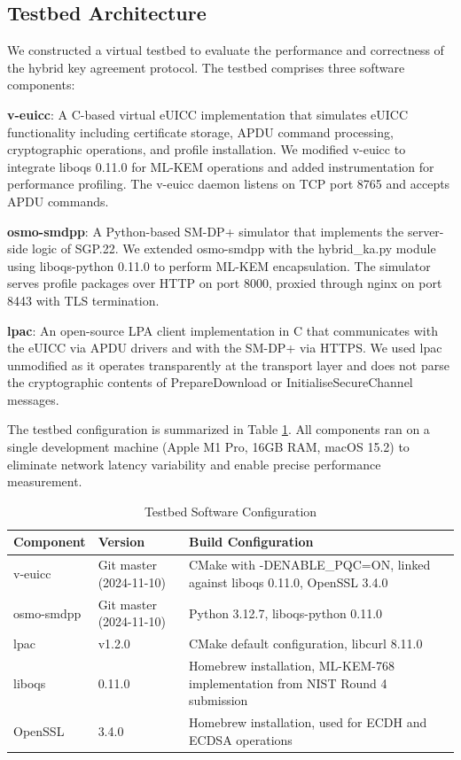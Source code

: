 \documentclass{easychair}
\begin{document}
\subsection{Testbed Architecture}

We constructed a virtual testbed to evaluate the performance and correctness of the hybrid key agreement protocol. The testbed comprises three software components:

\textbf{v-euicc}: A C-based virtual eUICC implementation that simulates eUICC functionality including certificate storage, APDU command processing, cryptographic operations, and profile installation. We modified v-euicc to integrate liboqs 0.11.0 for ML-KEM operations and added instrumentation for performance profiling. The v-euicc daemon listens on TCP port 8765 and accepts APDU commands.

\textbf{osmo-smdpp}: A Python-based SM-DP+ simulator that implements the server-side logic of SGP.22. We extended osmo-smdpp with the hybrid\_ka.py module using liboqs-python 0.11.0 to perform ML-KEM encapsulation. The simulator serves profile packages over HTTP on port 8000, proxied through nginx on port 8443 with TLS termination.

\textbf{lpac}: An open-source LPA client implementation in C that communicates with the eUICC via APDU drivers and with the SM-DP+ via HTTPS. We used lpac unmodified as it operates transparently at the transport layer and does not parse the cryptographic contents of PrepareDownload or InitialiseSecureChannel messages.

The testbed configuration is summarized in Table \ref{tab:testbed-config}. All components ran on a single development machine (Apple M1 Pro, 16GB RAM, macOS 15.2) to eliminate network latency variability and enable precise performance measurement.

\begin{table}[h]
\centering
\caption{Testbed Software Configuration}
\label{tab:testbed-config}
\begin{tabular}{@{}llp{5.5cm}@{}}
\toprule
\textbf{Component} & \textbf{Version} & \textbf{Build Configuration} \\
\midrule
v-euicc & Git master (2024-11-10) & CMake with -DENABLE\_PQC=ON, linked against liboqs 0.11.0, OpenSSL 3.4.0 \\
\midrule
osmo-smdpp & Git master (2024-11-10) & Python 3.12.7, liboqs-python 0.11.0 \\
\midrule
lpac & v1.2.0 & CMake default configuration, libcurl 8.11.0 \\
\midrule
liboqs & 0.11.0 & Homebrew installation, ML-KEM-768 implementation from NIST Round 4 submission \\
\midrule
OpenSSL & 3.4.0 & Homebrew installation, used for ECDH and ECDSA operations \\
\bottomrule
\end{tabular}
\end{table}
\end{document}
